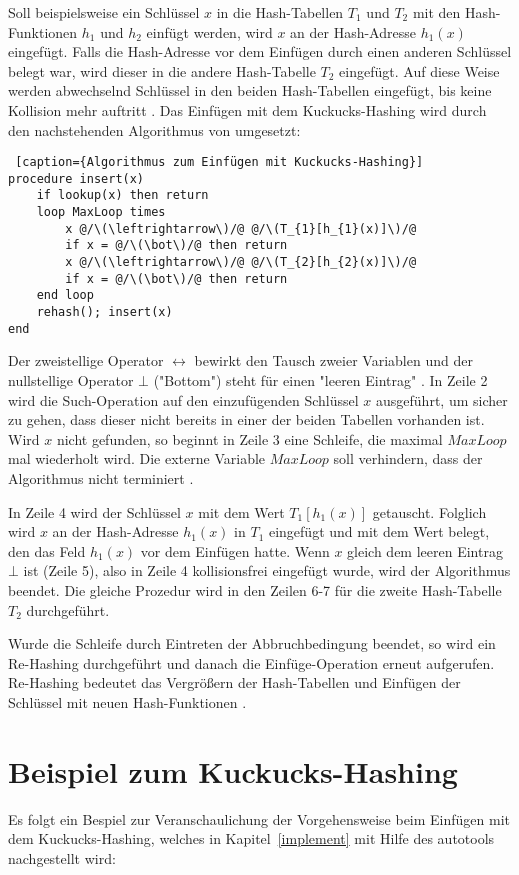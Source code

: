 Soll beispielsweise ein Schlüssel \(x\) in die Hash-Tabellen \(T_{1}\) und \(T_{2}\) mit den Hash-Funktionen \(h_{1}\) und \(h_{2}\) einfügt werden, wird \(x\) an der Hash-Adresse \(h_{1}(x)\) eingefügt. Falls die Hash-Adresse vor dem Einfügen durch einen anderen Schlüssel belegt war, wird dieser in die andere Hash-Tabelle \(T_{2}\) eingefügt. Auf diese Weise werden abwechselnd Schlüssel in den beiden Hash-Tabellen eingefügt, bis keine Kollision mehr auftritt \cite[S.~4]{ADScuckoo}. 
\newpage
Das Einfügen mit dem Kuckucks-Hashing wird durch den nachstehenden Algorithmus von \cite[S.~5]{ADScuckoo} umgesetzt:
\begin{lstlisting} [caption={Algorithmus zum Einfügen mit Kuckucks-Hashing}]
procedure insert(x)
	if lookup(x) then return
	loop MaxLoop times
		x @/\(\leftrightarrow\)/@ @/\(T_{1}[h_{1}(x)]\)/@
		if x = @/\(\bot\)/@ then return
		x @/\(\leftrightarrow\)/@ @/\(T_{2}[h_{2}(x)]\)/@
		if x = @/\(\bot\)/@ then return
	end loop
	rehash(); insert(x)
end
\end{lstlisting}
Der zweistellige Operator \(\leftrightarrow\) bewirkt den Tausch zweier Variablen und der nullstellige Operator \(\bot\) ("Bottom") steht für einen "leeren Eintrag" \cite[S.~73]{ADSWeiWei}. In Zeile 2 wird die Such-Operation auf den einzufügenden Schlüssel \(x\) ausgeführt, um sicher zu gehen, dass dieser nicht bereits in einer der beiden Tabellen vorhanden ist. Wird \(x\) nicht gefunden, so beginnt in Zeile 3 eine Schleife, die maximal \(MaxLoop\) mal wiederholt wird. Die externe Variable \(MaxLoop\) soll verhindern, dass der Algorithmus nicht terminiert \cite[S.~4]{ADScuckoo}. 

In Zeile 4 wird der Schlüssel \(x\) mit dem Wert \(T_{1}[h_{1}(x)]\) getauscht. Folglich wird \(x\) an der Hash-Adresse \(h_{1}(x)\) in \(T_{1}\) eingefügt und mit dem Wert belegt, den das Feld \(h_{1}(x)\) vor dem Einfügen hatte. Wenn \(x\) gleich dem leeren Eintrag \(\bot\) ist (Zeile 5), also in Zeile 4 kollisionsfrei eingefügt wurde, wird der Algorithmus beendet. Die gleiche Prozedur wird in den Zeilen 6-7 für die zweite Hash-Tabelle \(T_{2}\) durchgeführt. 

Wurde die Schleife durch Eintreten der Abbruchbedingung beendet, so wird ein Re-Hashing durchgeführt und danach die Einfüge-Operation erneut aufgerufen. Re-Hashing bedeutet das Vergrößern der Hash-Tabellen und Einfügen der Schlüssel mit neuen Hash-Funktionen \cite[S.~4]{ADScuckoo}.

\section{Beispiel zum Kuckucks-Hashing}\label{examplecuck}
Es folgt ein Bespiel zur Veranschaulichung der Vorgehensweise beim Einfügen mit dem Kuckucks-Hashing, welches in Kapitel~\ref{implement} mit Hilfe des autotools nachgestellt wird: 

